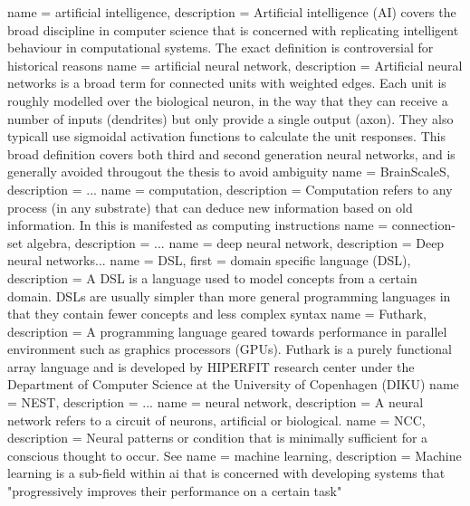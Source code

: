  {
    name = artificial intelligence,
    description = {Artificial intelligence (AI) covers the broad discipline in computer science
that is concerned with replicating intelligent behaviour in computational systems. The exact
definition is controversial for historical reasons \autocite{Nilsson2009}}
}
 {
  name = artificial neural network,
  description = {
    Artificial neural networks is a broad term for connected units with 
    weighted edges.
    Each unit is roughly modelled over the biological neuron, in the way 
    that they can receive a number of inputs (dendrites) 
    but only provide a single output (axon).
    They also typicall use sigmoidal activation functions to calculate the 
    unit responses.
    This broad definition covers both third and second generation neural
    networks, and is generally avoided througout the thesis to avoid 
    ambiguity}
}
 {
  name = BrainScaleS,
  description = {...}
}
 {
   name = computation,
   description = {Computation refers to any process (in any
substrate) that can deduce new information based on old information. In
this is manifested as computing instructions}
}
 {
  name = {connection-set algebra},
  description = {...}
}
 {
  name = {deep neural network},
  description = {Deep neural networks...}
}
 {
  name = {DSL},
  first = {domain specific language (DSL)},
  description = {A DSL is a language used to model concepts from a certain
    domain. DSLs are usually simpler than more general programming languages in
    that they contain fewer concepts and less complex syntax}
}
 {
   name = {Futhark},
   description = {A programming language geared towards performance in parallel environment such as
   graphics processors (GPUs). Futhark is a purely functional array language and is
   developed by HIPERFIT research center under the Department of Computer Science at the
   University of Copenhagen (DIKU)}
}
 {
  name = NEST,
  description = {...}
}
 {
  name = {neural network},
  description = {A neural network refers to a circuit of neurons, artificial or biological.}
}
 {
   name = {NCC},
   description = {Neural patterns or condition that is minimally sufficient for a conscious
thought to occur. See \autocite{atkinson2000, Hohwy2009}}
}
 {
  name = machine learning,
  description = {Machine learning is a sub-field within \gls{ai} that is concerned
    with developing systems that "progressively improves their performance on a
    certain task" \autocite{wiki:ml}}
}
